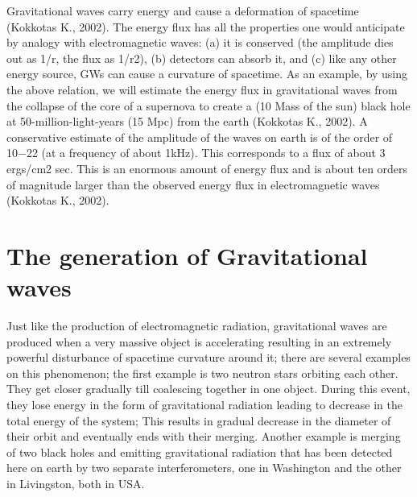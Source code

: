 \documentclass[11]{article}
\begin{document}
\vspace{5mm}
Gravitational waves carry energy and cause a deformation of spacetime (Kokkotas K., 2002). The energy flux has all the properties one would anticipate by analogy with electromagnetic waves: (a) it is conserved (the amplitude dies out as 1/r, the flux as 1/r2), (b) detectors can absorb it, and (c) like any other energy source, GWs can cause a curvature of spacetime. As an example, by using the above relation, we will estimate the energy flux in gravitational waves from the collapse of the core of a supernova to create a (10 Mass of the sun) black hole at 50-million-light-years (15 Mpc) from the earth (Kokkotas K., 2002). A conservative estimate of the amplitude of the waves on earth is of the order of 10−22 (at a frequency of about 1kHz). This corresponds to a flux of about 3 ergs/cm2 sec. This is an enormous amount of energy flux and is about ten orders of magnitude larger than the observed energy flux in electromagnetic waves (Kokkotas K., 2002).
\section{The generation of Gravitational waves}
Just like the production of electromagnetic radiation, gravitational waves are produced when a very massive object is accelerating resulting in an extremely powerful disturbance of spacetime curvature around it; there are several examples on this phenomenon; the first example is two neutron stars orbiting each other. They get closer gradually till coalescing together in one object. During this event, they lose energy in the form of gravitational radiation leading to decrease in the total energy of the system; This results in gradual decrease in the diameter of their orbit and eventually ends with their merging. Another example is merging of two black holes and emitting gravitational radiation that has been detected here on earth by two separate interferometers, one in Washington and the other in Livingston, both in USA.
\end{document}
